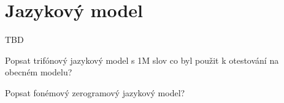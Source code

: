\section{Jazykový model}
\label{chap:construction:lm}

TBD

Popsat trifónový jazykový model s 1M slov co byl použit k otestování na obecném modelu?

Popsat fonémový zerogramový jazykový model?
